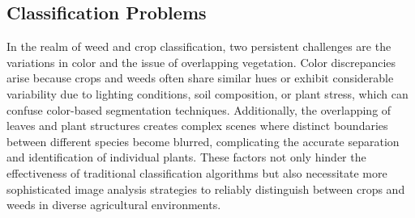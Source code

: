 \documentclass[letterpaper]{report}
\begin{document}
%
%
%

\subsection{Classification Problems}
In the realm of weed and crop classification, two persistent challenges are the variations in color and the issue of overlapping vegetation. Color discrepancies arise because crops and weeds often share similar hues or exhibit considerable variability due to lighting conditions, soil composition, or plant stress, which can confuse color-based segmentation techniques. Additionally, the overlapping of leaves and plant structures creates complex scenes where distinct boundaries between different species become blurred, complicating the accurate separation and identification of individual plants. These factors not only hinder the effectiveness of traditional classification algorithms but also necessitate more sophisticated image analysis strategies to reliably distinguish between crops and weeds in diverse agricultural environments.
\end{document}
